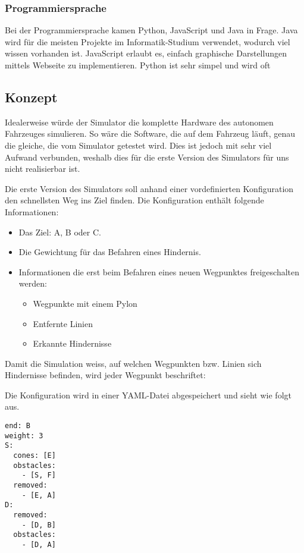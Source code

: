 \documentclass[../main.tex]{subfiles}
\begin{document}
\subsubsection{Programmiersprache}

Bei der Programmiersprache kamen Python, JavaScript und Java in Frage.
Java wird für die meisten Projekte im Informatik-Studium verwendet, wodurch viel wissen vorhanden ist. JavaScript erlaubt es, einfach graphische Darstellungen mittels Webseite zu implementieren. Python ist sehr simpel und wird oft  

\subsection{Konzept}

Idealerweise würde der Simulator die komplette Hardware des autonomen Fahrzeuges simulieren. So wäre die Software, die auf dem Fahrzeug läuft, genau die gleiche, die vom Simulator getestet wird. Dies ist jedoch mit sehr viel Aufwand verbunden, weshalb dies für die erste Version des Simulators für uns nicht realisierbar ist.

Die erste Version des Simulators soll anhand einer vordefinierten Konfiguration den schnellsten Weg ins Ziel finden. Die Konfiguration enthält folgende Informationen:
\begin{itemize}
    \item Das Ziel: A, B oder C.
    \item Die Gewichtung für das Befahren eines Hindernis.
    \item Informationen die erst beim Befahren eines neuen Wegpunktes freigeschalten werden:
     \begin{itemize}
        \item{Wegpunkte mit einem Pylon}
        \item{Entfernte Linien}
        \item{Erkannte Hindernisse}
   \end{itemize}
\end{itemize}


Damit die Simulation weiss, auf welchen Wegpunkten bzw. Linien sich Hindernisse befinden, wird jeder Wegpunkt beschriftet:


Die Konfiguration wird in einer YAML-Datei abgespeichert und sieht wie folgt aus.

\begin{verbatim}
end: B
weight: 3
S:
  cones: [E]
  obstacles: 
    - [S, F] 
  removed:
    - [E, A]
D:
  removed:
    - [D, B]
  obstacles:
    - [D, A]
\end{verbatim}
\end{document}
